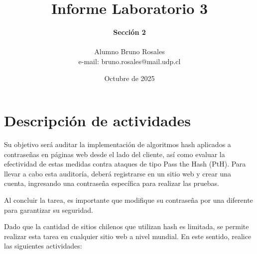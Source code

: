 \documentclass[letter,12pt]{article}
\begin{document}
%
   \title{\Huge{Informe Laboratorio 3}}

   \author{\textbf{Sección 2} \\  \\Alumno Bruno Rosales \\ e-mail: bruno.rosales@mail.udp.cl}
          
   \date{Octubre de 2025}

   \maketitle
   
   \tableofcontents
 
  \newpage
  

\section{Descripción de actividades}
Su objetivo será auditar la implementación de algoritmos hash aplicados a contraseñas en páginas web desde el lado del cliente, así como evaluar la efectividad de estas medidas contra ataques de tipo Pass the Hash (PtH). Para llevar a cabo esta auditoría, deberá registrarse en un sitio web y crear una cuenta, ingresando una contraseña específica para realizar las pruebas.\par

Al concluir la tarea, es importante que modifique su contraseña por una diferente para garantizar su seguridad.\par

Dado que la cantidad de sitios chilenos que utilizan hash es limitada, se permite realizar esta tarea en cualquier sitio web a nivel mundial. En este sentido, realice las siguientes actividades:
\end{document}

